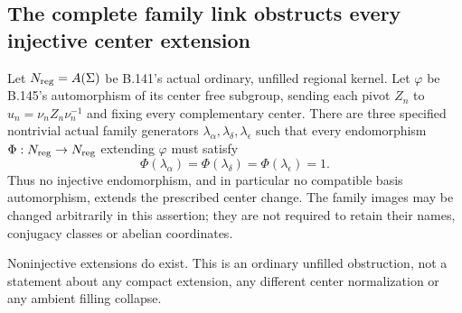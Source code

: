 \subsection*{The complete family link obstructs every injective center extension}

\label{stmt:B147}
Let $N_{\rm reg}=A(\Sigma)$ be B.141's actual ordinary, unfilled
regional kernel. Let $\varphi$ be B.145's automorphism of its
center free subgroup, sending each pivot $Z_n$ to
$u_n=\nu_nZ_n\nu_n^{-1}$ and fixing every complementary center.
There are three specified nontrivial actual family generators
$\lambda_\alpha,\lambda_\delta,\lambda_\epsilon$ such that every
endomorphism $\Phi:N_{\rm reg}\to N_{\rm reg}$ extending
$\varphi$ must satisfy
\begin{equation}\label{eq:B147-forced-killing}
 \Phi(\lambda_\alpha)=\Phi(\lambda_\delta)
                     =\Phi(\lambda_\epsilon)=1.
\end{equation}
Thus no injective endomorphism, and in particular no compatible
basis automorphism, extends the prescribed center change. The
family images may be changed arbitrarily in this assertion;
they are not required to retain their names, conjugacy classes
or abelian coordinates.

Noninjective extensions do exist. This is an ordinary unfilled
obstruction, not a statement about any compact extension, any
different center normalization or any ambient filling collapse.

